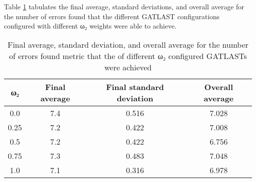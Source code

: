 Table \ref{tab:HP:GA:MWeight:number of errors found} tabulates the final average, standard deviations, and overall average for the number of errors found that the different GATLAST configurations configured with different ω₂ weights were able to achieve.
\begin{table}[tbh!]
\centering
\begin{adjustbox}{trim=0cm 0cm 0cm 0cm, clip=true}
\begin{tabular}{|c|c|c|c|}
\hline
ω₂ & Final average & Final standard deviation & Overall average\\
\hline
0.0 & 7.4 & 0.516 & 7.028\\\hline
0.25 & 7.2 & 0.422 & 7.008\\\hline
0.5 & 7.2 & 0.422 & 6.756\\\hline
0.75 & 7.3 & 0.483 & 7.048\\\hline
1.0 & 7.1 & 0.316 & 6.978\\\hline
\end{tabular}
\end{adjustbox}
\caption{Final average, standard deviation, and overall average for the number of errors found metric that the of different ω₂ configured GATLASTs were achieved}
\label{tab:HP:GA:MWeight:number of errors found}
\end{table}